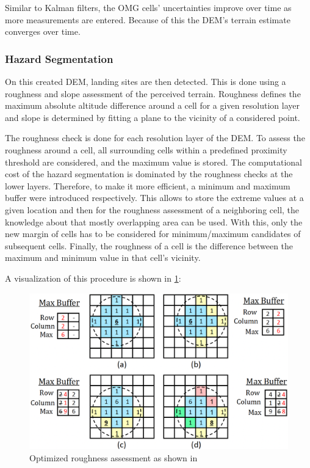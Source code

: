 Similar to Kalman filters, the OMG cells' uncertainties improve over time as more measurements are entered. Because of this the DEM's terrain estimate converges over time. 

\subsubsection{Hazard Segmentation}\label{subsubsec:setup:haz_seg}

On this created DEM, landing sites are then detected. This is done using a roughness and slope assessment of the perceived terrain. Roughness defines the maximum absolute altitude difference around a cell for a given resolution layer and slope is determined by fitting a plane to the vicinity of a considered point.

The roughness check is done for each resolution layer of the DEM. To assess the roughness around a cell, all surrounding cells within a predefined proximity threshold are considered, and the maximum value is stored. The computational cost of the hazard segmentation is dominated by the roughness checks at the lower layers. Therefore, to make it more efficient, a minimum and maximum buffer were introduced respectively. This allows to store the extreme values at a given location and then for the roughness assessment of a neighboring cell, the knowledge about that mostly overlapping area can be used. With this, only the new margin of cells has to be considered for minimum/maximum candidates of subsequent cells. Finally, the roughness of a cell is the difference between the maximum and minimum value in that cell's vicinity.

A visualization of this procedure is shown in \cref{fig:lsd_roughness_check}:

\begin{figure}[ht!]
    \centering
    \includegraphics[scale=0.5]{images/system_overview/roughness_check.png}
    \caption{Optimized roughness assessment as shown in \citet{LSD2}}
    \label{fig:lsd_roughness_check}
\end{figure}

